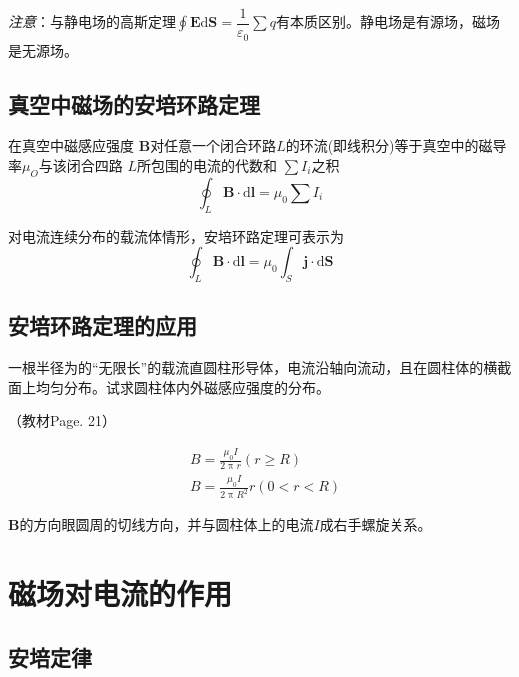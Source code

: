 \documentclass[
	12pt, %
	a4paper, %
]{myLegrandOrangeBook}
\newcommand{\rmd}{\mathrm{d}}
\begin{document}
\emph{注意}：与静电场的高斯定理$\oint \mathbf{E} \rmd \mathbf{S} = \dfrac{1}{\varepsilon_0} \sum q$有本质区别。静电场是有源场，磁场是无源场。

\subsection{真空中磁场的安培环路定理}

\begin{theorem}[真空中磁场的安培环路定理]
在真空中磁感应强度 $\mathbf{B}$对任意一个闭合环路$L$的环流(即线积分)等于真空中的磁导率$\mu_ O $与该闭合四路 $L $所包围的电流的代数和 $\sum I_ i$之积
\begin{equation}
    \oint_L \mathbf{B} \cdot \rmd \mathbf{l} = \mu_0 \sum I_i
\end{equation}
\end{theorem}

对电流连续分布的载流体情形，安培环路定理可表示为
\begin{equation}
    \oint_L \mathbf{B} \cdot \rmd \mathbf{l} = \mu_0 \int_S \mathbf{j} \cdot \rmd \mathbf{S}
\end{equation}

\subsection{安培环路定理的应用}

一根半径为的“无限长”的载流直圆柱形导体，电流沿轴向流动，且在圆柱体的横截面上均匀分布。试求圆柱体内外磁感应强度的分布。

（教材Page. 21）

\begin{equation*}
    \begin{aligned}
        & B = \frac{\mu_0 I}{2 \uppi r} (r \geq R) \\
        & B = \frac{\mu_0 I}{2 \uppi R^2} r (0 < r < R)
    \end{aligned}
\end{equation*}

\(\mathbf{B}\)的方向眼圆周的切线方向，并与圆柱体上的电流\(I\)成右手螺旋关系。

\section{磁场对电流的作用}

\subsection{安培定律}
\end{document}
